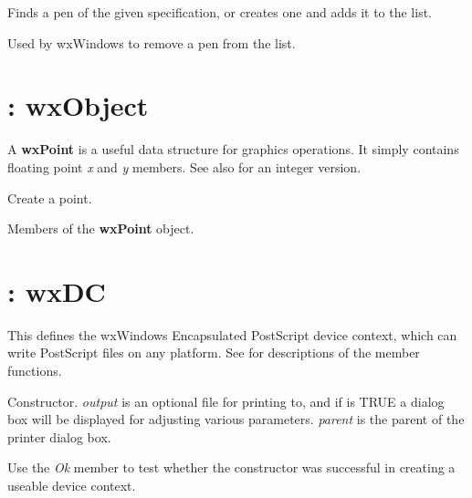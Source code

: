 
Finds a pen of the given specification, or creates one and adds it to the list.



Used by wxWindows to remove a pen from the list.

\section{: wxObject}\label{wxpoint}

A {\bf wxPoint} is a useful data structure for graphics operations.
It simply contains floating point {\it x} and {\it y} members.
See also  for an integer version.




Create a point.



Members of the {\bf wxPoint} object.

\section{: wxDC}\label{wxpostscriptdc}

This defines the wxWindows Encapsulated PostScript device context,
which can write PostScript files on any platform. See  for
descriptions of the member functions.



Constructor. {\it output} is an optional file for printing to, and if
 is TRUE a dialog box will be displayed for adjusting
various parameters. {\it parent} is the parent of the printer dialog box.

Use the {\it Ok} member to test whether the constructor was successful
in creating a useable device context.

